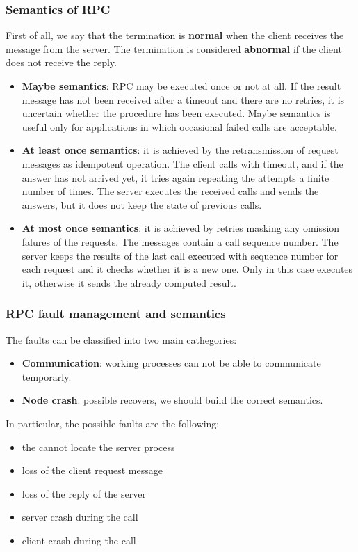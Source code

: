 \documentclass[11pt,a4paper]{article}
\begin{document}
\subsubsection{Semantics of RPC}
First of all, we say that the termination is \textbf{normal} when the client receives the message from the server. The termination is considered \textbf{abnormal} if the client does not receive the reply.

\begin{itemize}
	\item \textbf{Maybe semantics}: RPC may be executed once or not at all. If the result message has not been received after a timeout and there are no retries, it is uncertain whether the procedure has been executed. Maybe semantics is useful only for applications in which occasional failed calls are acceptable.
	\item \textbf{At least once semantics}: it is achieved by the retransmission of request messages as idempotent operation. The client calls with timeout, and if the answer has not arrived yet, it tries again repeating the attempts a finite number of times. The server executes the received calls and sends the answers, but it does not keep the state of previous calls.
	\item \textbf{At most once semantics}: it is achieved by retries masking any omission falures of the requests. The messages contain a call sequence number. The server keeps the results of the last call executed with sequence number for each request and it checks whether it is a new one. Only in this case executes it, otherwise it sends the already computed result.
\end{itemize}

\subsubsection{RPC fault management and semantics}
The faults can be classified into two main cathegories:
\begin{itemize}
	\item \textbf{Communication}: working processes can not be able to communicate temporarly.
	\item \textbf{Node crash}: possible recovers, we should build the correct semantics.
\end{itemize}

In particular, the possible faults are the following:
\begin{itemize}
	\item the cannot locate the server process
	\item loss of the client request message
	\item loss of the reply of the server
	\item server crash during the call
	\item client crash during the call
\end{itemize}
\end{document}
